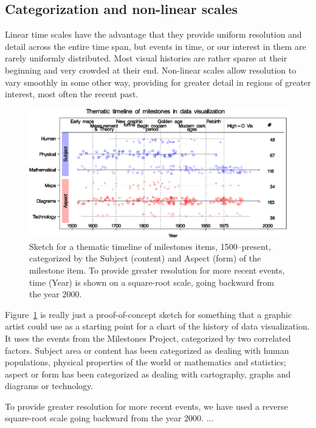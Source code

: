 \documentclass[11pt]{article}
\newcommand*{\figref}[1]{Figure~\ref{#1}}
\begin{document}
\subsection{Categorization and non-linear scales}

Linear time scales have the advantage that they
provide uniform resolution and detail across the entire time span, but events in time, or our interest in them are rarely uniformly distributed. Most visual histories are rather sparse at their beginning and very
crowded at their end.
Non-linear scales allow resolution to vary smoothly in some other way, providing for greater detail
in regions of greater interest, most often the recent past.


\begin{figure}[!htb]
  \centering
  \includegraphics[width=\textwidth,clip]{fig/milecatline}
  \caption{Sketch for a thematic timeline of milestones items, 1500--present,
  categorized by the Subject (content)
  and Aspect (form) of the milestone item.  To provide greater resolution for more recent events,
  time (Year) is shown on a square-root scale, going backward from the year 2000.
  }
  \label{fig:milecatline}
\end{figure}

\figref{fig:milecatline} is really just a proof-of-concept sketch for something that a graphic artist
could use as a starting point for a chart of
the history of data visualization. It uses the events from the
Milestones Project, categorized by two correlated factors. Subject area or content has been
categorized as dealing with human populations, physical properties of the world or
mathematics and statistics; aspect or form has been categorized as dealing with
cartography, graphs and diagrams or technology. 

To provide greater resolution for more recent events, we have used a reverse square-root
scale going backward from the year 2000. ...
\end{document}
